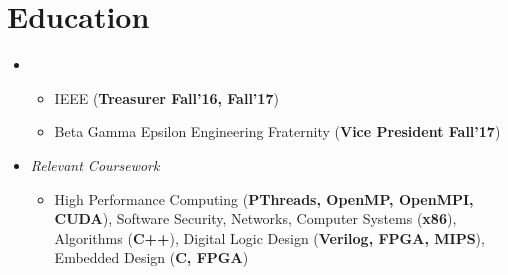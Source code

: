 \documentclass[11pt,letterpaper,sans]{moderncv}
\begin{document}
\makecvtitle

\vspace{-40pt}





\section{Education}
\vspace{5pt}


\begin{itemize}

\item[] {}
\vspace{-1mm}	\begin{itemize}
	 \item IEEE (\textbf{Treasurer Fall'16, Fall'17})
	 \item Beta Gamma Epsilon Engineering Fraternity (\textbf{Vice President Fall'17})
	\end{itemize}
	
\item[] {\textit{Relevant Coursework}}
\vspace{-1mm} \begin{itemize}
               \item High Performance Computing (\textbf{PThreads, OpenMP, OpenMPI, CUDA}), 
               Software Security, 
               Networks,
               Computer Systems (\textbf{x86}),
               Algorithms (\textbf{C++}),
               Digital Logic Design 
               (\textbf{Verilog, FPGA, MIPS}), 
               Embedded Design (\textbf{C, FPGA})
              \end{itemize}


\end{itemize}
\end{document}
